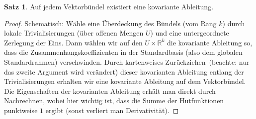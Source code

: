 \documentclass[a4paper]{scrbook}
\numberwithin{equation}{chapter}
\newcommand{\R}{\mathbb{R}}
\theoremstyle{definition}
\newtheorem{satz}[defn]{Satz}
\begin{document}
		\begin{satz}
			Auf jedem Vektorbündel existiert eine kovariante Ableitung.
			\begin{proof}
				Schematisch: Wähle eine Überdeckung des Bündels (vom Rang $k$) durch lokale Trivialisierungen (über offenen Mengen $U$) und eine untergeordnete Zerlegung der Eins. Dann wählen wir auf den $U\times \R^k$ die kovariante Ableitung so, dass die Zusammenhangskoeffizienten in der Standardbasis (also dem globalen Standardrahmen) verschwinden.
				Durch \glqq kartenweises Zurückziehen\grqq\ (beachte: nur das zweite Argument wird verändert) dieser kovarianten Ableitung entlang der Trivialisierungen erhalten wir eine kovariante Ableitung auf dem Vektorbündel. Die Eigenschaften der kovarianten Ableitung erhält man direkt durch Nachrechnen, wobei hier wichtig ist, dass die Summe der Hutfunktionen punktweise $1$ ergibt (sonst verliert man Derivativität).
			\end{proof}
		\end{satz}
\end{document}
